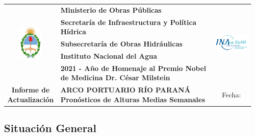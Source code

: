 \documentclass[11pt,spanish,a4paper] {article}
\DeclareRobustCommand{\fechaformat}{}
\DeclareRobustCommand{\situaciongeneral}{}
\begin{document}
\captionsetup{labelformat=empty}
\begingroup
\begin{center}
\renewcommand{\arraystretch}{0.8}
\begin{tabularx}{\textwidth}{|c|>{\centering\arraybackslash}X|c|}
	\hline
	\multirow{5}{*}{\includegraphics[height=1.7cm]{escudo_argentina.png}} & \textbf{\small{Ministerio de Obras Públicas}} & \multirow{5}{*}{\includegraphics[width=2.6cm,height=1.3cm]{logo_ina_crop.png}}  \\
	& \textbf{\small{Secretaría de Infraestructura y Política Hídrica}} & \\
	& \textbf{\small{Subsecretaría de Obras Hidráulicas}} & \\
	& \textbf{\small{Instituto Nacional del Agua}} & \\ 
	& \textbf{\small{2021 - Año de Homenaje al Premio Nobel de Medicina Dr. César Milstein}} & \\ 
	\hline
	   \makecell{\large{\textbf{Informe de}} \\ \large{\textbf{Actualización}}} &  \makecell{\large{\textbf{ARCO PORTUARIO RÍO PARANÁ}}  \\ \textbf{Pronósticos de Alturas Medias Semanales}} & Fecha: \fechaformat \\
	\hline
\end{tabularx}
\end{center}
\endgroup
\subsection*{Situación General}
\situaciongeneral
\end{document}
